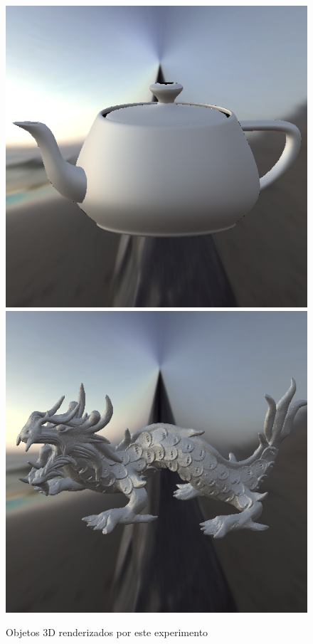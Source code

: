\begin{figure}[H]
    \caption{\small{Objetos 3D renderizados por este experimento}}\label{fig-ward-eqlang}
  \includegraphics[width=\linewidth]{./Imagens/brdfs/ward-teapot.png}
\endminipage\hfill
{}
  \includegraphics[width=\linewidth]{./Imagens/brdfs/ward-dragon.png}

\end{figure}
